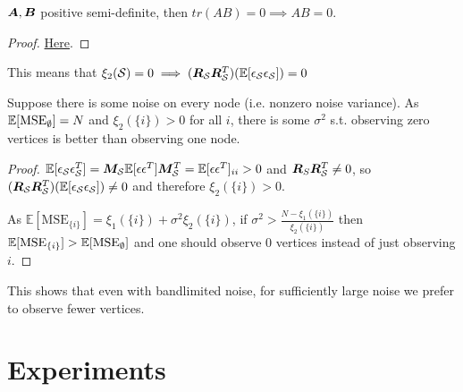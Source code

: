 {\begin{lemma}
$\bm{A},\bm{B}$ positive semi-definite, then $tr(AB) = 0 \implies AB = 0$.
\end{lemma}
\begin{proof}
    \href{https://math.stackexchange.com/questions/3536270/if-a-b-are-positive-semi-definite-then-trab-0-iff-ab-0}{Here}.
\end{proof}
This means that $\xi_{2}(\mathcal{S}) = 0 \implies (\bm{R}_{\mathcal{S}}\bm{R}_{\mathcal{S}}^{T})(\mathbb{E}[\epsilon_{\mathcal{S}}\epsilon_{\mathcal{S}}]) = 0$
\begin{remark}
    Suppose there is some noise on every node (i.e. nonzero noise variance). As $\mathbb{E}[\textrm{MSE}_{\mathcal{\emptyset}}] = N$ and $\xi_{2}(\{i\}) > 0$ for all $i$, there is some $\sigma^{2}$ s.t. observing zero vertices is better than observing one node.
\end{remark}
\begin{proof}
    $\mathbb{E}[\epsilon_{\mathcal{S}}\epsilon_{\mathcal{S}}^{T}] = \bm{M}_{\mathcal{S}}\mathbb{E}[\epsilon\epsilon^{T}]\bm{M}_{\mathcal{S}}^{T} = \mathbb{E}[\epsilon\epsilon^{T}]_{ii} > 0 $ and $\bm{R}_{S}\bm{R}_{\mathcal{S}}^{T} \neq 0$, so $(\bm{R}_{\mathcal{S}}\bm{R}_{\mathcal{S}}^{T})(\mathbb{E}[\epsilon_{\mathcal{S}}\epsilon_{\mathcal{S}}]) \neq 0$ and therefore $\xi_{2}(\{i\}) > 0$.

    As $\mathbb{E}[\mathrm{MSE}_{\{i\}}] = \xi_{1}(\{i\}) + \sigma^{2} \xi_{2}(\{i\})$, if $\sigma^{2} > \frac{N - \xi_{1}(\{i\})}{\xi_{2}(\{i\})}$ then $\mathbb{E}[\mathrm{MSE}_{\{i\}}] > \mathbb{E}[\mathrm{MSE}_{\mathcal{\emptyset}}] $ and one should observe 0 vertices instead of just observing $i$. 
\end{proof}

This shows that even with bandlimited noise, for sufficiently large noise we prefer to observe fewer vertices.
}
\fi


\section{Experiments}
\label{sec:experiments_GLR}
\label{experiments_sec}




